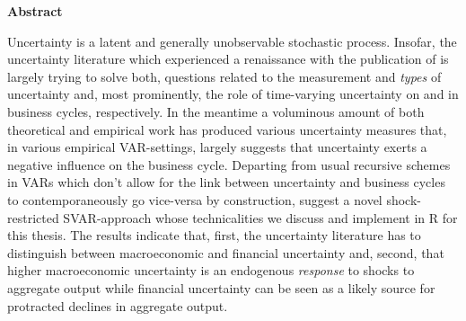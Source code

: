 \documentclass[a4paper,11pt,listof=nochaptergap,oneside,pointednumbers,bibtotoc,bigheadings,liststotoc,hidelinks]{scrbook}
\makeatletter
\theoremstyle{mysatz}
\theoremstyle{mydefinition}
\theoremstyle{mytheorem}
\theoremstyle{mybemerkung}
\newcommand\abstractname{Abstract}  %
\newenvironment{abstract}{%
      \titlepage
      \null\vfil
      \@beginparpenalty\@lowpenalty
      \begin{center}%
        \bfseries \abstractname
        \@endparpenalty\@M
      \end{center}}%
     {\par\vfil\null\endtitlepage}
\newenvironment{abstract}{%
      \if@twocolumn
        \section*{\abstractname}%
      \else
        \small
        \begin{center}%
          {\bfseries \abstractname\vspace{-.5em}\vspace{\z@}}%
        \end{center}%
        \quotation
      \fi}
      {\if@twocolumn\else\endquotation\fi}
\makeatother
\begin{document}

\thispagestyle{empty} 
\begin{abstract}
Uncertainty is a latent and generally unobservable stochastic process. Insofar, the uncertainty literature which experienced a renaissance with the publication of \citet{bloom:09} is largely trying to solve both, questions related to the measurement and \textit{types} of uncertainty and, most prominently, the role of time-varying uncertainty on and in business cycles, respectively. In the meantime a voluminous amount of both theoretical and empirical work has produced various uncertainty measures that, in various empirical VAR-settings, largely suggests that uncertainty exerts a negative influence on the business cycle. Departing from usual recursive schemes in VARs which don't allow for the link between uncertainty and business cycles to contemporaneously go vice-versa by construction, \citep{ludvigsonetal:18, ludvigsonetal:19} suggest a novel shock-restricted SVAR-approach whose technicalities we discuss and implement in R for this thesis. The results indicate that, first, the uncertainty literature has to distinguish between macroeconomic and financial uncertainty and, second, that higher macroeconomic uncertainty is an endogenous \textit{response} to shocks to aggregate output while financial uncertainty can be seen as a likely source for protracted declines in aggregate output.
\end{abstract}
\end{document}
